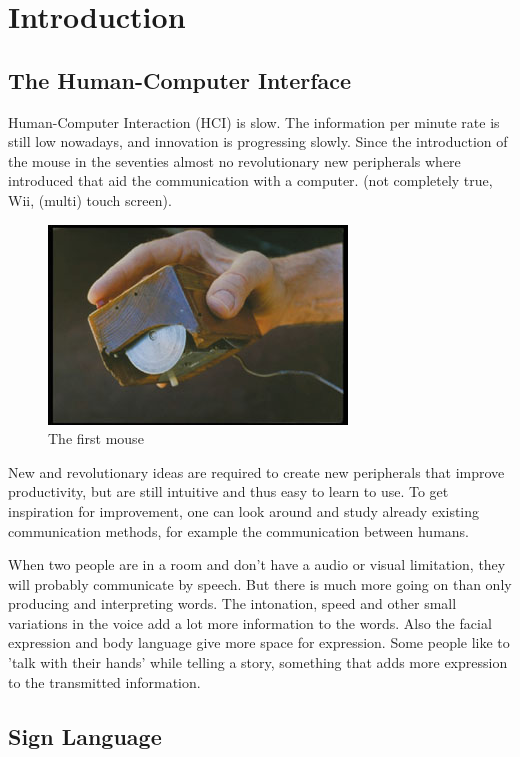 
\chapter{Introduction}
\label{ch:intro}

\section{The Human-Computer Interface}


Human-Computer Interaction  (HCI) is slow. The information per minute rate is still low nowadays, and innovation is progressing slowly. Since the introduction of the mouse in the seventies almost no revolutionary new peripherals where introduced that aid the communication with a computer. (not completely true, Wii, (multi) touch screen).

\begin{figure}[htbp]
	\center{}
	\label{fig:mouse}
	\includegraphics[width=0.3\linewidth]{figures/mouse.jpg}
	\caption{The first mouse}
\end{figure}

New and revolutionary ideas are required to create new peripherals that improve productivity, but are still intuitive and thus easy to learn to use. To get inspiration for improvement, one can look around and study already existing communication methods, for example the communication between humans. 

When two people are in a room and don't have a audio or visual limitation, they will probably communicate by speech. But there is much more going on than only producing and interpreting words. The intonation, speed and other small variations in the voice add a lot more information to the words. Also the facial expression and body language give more space for expression. Some people like to 'talk with their hands' while telling a story, something that adds more expression to the transmitted information.

\section{Sign Language}

